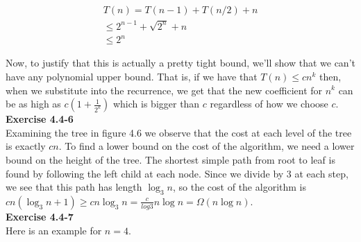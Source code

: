 \documentclass{article}
\begin{document}
\begin{align*}
T(n) = T(n-1) + T(n/2) + n\\
\le 2^{n-1} + \sqrt{2^{n}} + n\\
\le 2^{n}
\end{align*}

Now, to justify that this is actually a pretty tight bound, we'll show that we can't have any polynomial upper bound. That is, if we have that $T(n)\le cn^k$ then, when we substitute into the recurrence, we get that the new coefficient for $n^k$ can be as high as $c(1+\frac{1}{2^k})$ which is bigger than $c$ regardless of how we choose $c$.\\ 

\noindent\textbf{Exercise 4.4-6}\\

Examining the tree in figure 4.6 we observe that the cost at each level of the tree is exactly $cn$.  To find a lower bound on the cost of the algorithm, we need a lower bound on the height of the tree.  The shortest simple path from root to leaf is found by following the left child at each node.  Since we divide by 3 at each step, we see that this path has length $\log_3 n$, so the cost of the algorithm is $cn(\log_3 n + 1) \geq cn\log_3 n = \frac{c}{log 3} n \log n = \Omega(n \log n)$. \\

\noindent\textbf{Exercise 4.4-7}\\

Here is an example for $n=4$.


\end{document}

